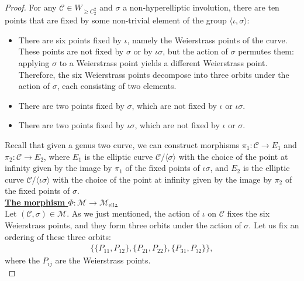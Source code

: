 \documentclass{amsart}
\newcommand{\calC}{\mathcal{C}}
\newcommand{\calM}{\mathcal{M}}
\newcommand{\mell}{\mathcal{M}_{\text{ell}}}
\numberwithin{equation}{section}
\theoremstyle{definition}
\theoremstyle{remark}
\begin{document}
\begin{proof}
For any $\calC\in W_{\geq C_2^2}$ and $\sigma$ a non-hyperelliptic involution, there are ten points that are fixed by some non-trivial element of the group $\langle\iota,\sigma\rangle$:
\begin{itemize}
    \item There are six points fixed by $\iota$, namely the Weierstrass points of the curve.  These points are not fixed by $\sigma$ or by $\iota\sigma$, but the action of $\sigma$ permutes them: applying $\sigma$ to a Weierstrass point yields a different Weierstrass point. Therefore, the six Weierstrass points decompose into three orbits under the action of $\sigma$, each consisting of two elements.
    \item There are two points fixed by $\sigma$, which are not fixed by $\iota$ or $\iota\sigma$.
    \item There are two points fixed by $\iota\sigma$, which are not fixed by $\iota$ or $\sigma$.
\end{itemize}


Recall that given a genus two curve, we can construct morphisms $\pi_1:\calC\rightarrow E_1$ and $\pi_2:\calC\rightarrow E_2$, where $E_1$ is the elliptic curve $\calC/\langle\sigma\rangle$
with the choice of the point at infinity given by the image by $\pi_1$ of the fixed points of $\iota\sigma$, and $E_2$ is the elliptic curve $\calC/\langle\iota\sigma\rangle$
with the choice of the point at infinity given by the image by $\pi_2$ of the fixed points of $\sigma$.\\


\underline{\textbf{The morphism $\Phi:\calM\rightarrow\mell$.}}\\

Let $(\calC,\sigma)\in\calM$. As we just mentioned, the action of $\iota$ on $\calC$ fixes the six Weierstrass points, and they form three orbits under the action of $\sigma$. Let us fix an ordering of these three orbits: 
\begin{align*}
\{\{P_{11},P_{12}\},\{P_{21},P_{22}\},\{P_{31},P_{32}\}\},
\end{align*}
where the $P_{ij}$ are the Weierstrass points.\\


\end{proof}
\end{document}
